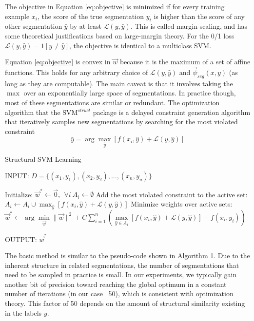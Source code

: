 \documentclass[10pt, onecolumn]{article}
\newcommand{\1}{\textbf{1}}
\begin{document}
The objective in Equation \ref{eq:objective} is minimized if for every training example $x_i$, the score of the true segmentation $y_i$ is higher than the score of any other segmentation $\hat{y}$ by at least $\mathcal{L}(y,\hat{y})$.  This is called margin-scaling, and has some theoretical justifications based on large-margin theory.  For the 0/1 loss $\mathcal{L}(y,\hat{y})=1[y \ne \hat{y}]$, the objective is identical to a multiclass SVM.  

Equation \ref{eq:objective} is convex in $\vec{w}$ because it is the maximum of a set of affine functions.  This holds for any arbitrary choice of $\mathcal{L}(y,\hat{y})$ and $\vec{\psi}_{seg}(x,y)$ (as long as they are computable).  The main caveat is that it involves taking the $\max$ over an exponentially large space of segmentations.  In practice though, most of these segmentations are similar or redundant.  The optimization algorithm that the SVM$^{struct}$ package is a delayed constraint generation algorithm that iteratively samples new segmentations by searching for the most violated constraint
\begin{equation}
\bar{y} = \arg\max_{\hat{y}} \left[ f(x_i,\hat{y}) + \mathcal{L}(y,\hat{y}) \right]
\label{eq:most_violated}
\end{equation}

\begin{algorithm}[t]
\caption{Structural SVM Learning}
INPUT: $D=\{(x_1,y_1),(x_2,y_2),...,(x_n,y_n)\}$
\begin{algorithmic}[1]
\STATE Initialize: $\vec{w}^* \gets \vec{0},\ \ \forall i\ A_i \gets \emptyset$ 
\REPEAT
{}
\STATE Add the most violated constraint to the active set: $A_i \gets A_i \cup \max_{\hat{y}} \left[ f(x_i,\hat{y}) + \mathcal{L}(y,\hat{y}) \right]$ 
\ENDFOR
\STATE Minimize weights over active sets: $\vec{w}^* \gets \arg\min\limits_{\vec{w}} \|\vec{w}\|^2 + C \sum\limits_{i=1}^n \left( \max\limits_{\hat{y} \in A_i} \left[ f(x_i,\hat{y}) + \mathcal{L}(y,\hat{y}) \right] - f(x_i,y_i) \right)$ 
\end{algorithmic}
OUTPUT: $\vec{w}^*$
\end{algorithm}

The basic method is similar to the pseudo-code shown in Algorithm 1.  Due to the inherent structure in related segmentations, the number of segmentations that need to be sampled in practice is small.  In our experiments, we typically gain another bit of precision toward reaching the global optimum in a constant number of iterations (in our case ~50), which is consistent with optimization theory.  This factor of 50 depends on the amount of structural similarity existing in the labels $y$.
\end{document}
